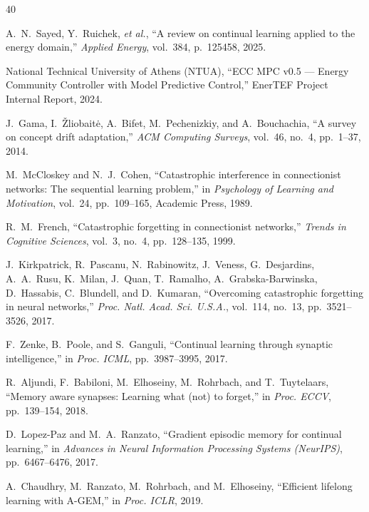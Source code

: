 \documentclass[journal]{IEEEtran}
\begin{document}
\begin{thebibliography}{40}

A.~N.~Sayed, Y.~Ruichek, \emph{et al.}, ``A review on continual
learning applied to the energy domain,'' \emph{Applied Energy},
vol.~384, p.~125458, 2025.

National Technical University of Athens (NTUA), ``ECC MPC v0.5 ---
Energy Community Controller with Model Predictive Control,'' EnerTEF
Project Internal Report, 2024.

J.~Gama, I.~\v{Z}liobait\.e, A.~Bifet, M.~Pechenizkiy, and
A.~Bouchachia, ``A survey on concept drift adaptation,''
\emph{ACM Computing Surveys}, vol.~46, no.~4, pp.~1--37, 2014.

M.~McCloskey and N.~J.~Cohen, ``Catastrophic interference in
connectionist networks: The sequential learning problem,'' in
\emph{Psychology of Learning and Motivation}, vol.~24, pp.~109--165,
Academic Press, 1989.

R.~M.~French, ``Catastrophic forgetting in connectionist networks,''
\emph{Trends in Cognitive Sciences}, vol.~3, no.~4, pp.~128--135, 1999.

J.~Kirkpatrick, R.~Pascanu, N.~Rabinowitz, J.~Veness, G.~Desjardins,
A.~A.~Rusu, K.~Milan, J.~Quan, T.~Ramalho, A.~Grabska-Barwinska,
D.~Hassabis, C.~Blundell, and D.~Kumaran, ``Overcoming catastrophic
forgetting in neural networks,'' \emph{Proc. Natl. Acad. Sci. U.S.A.},
vol.~114, no.~13, pp.~3521--3526, 2017.

F.~Zenke, B.~Poole, and S.~Ganguli, ``Continual learning through
synaptic intelligence,'' in \emph{Proc. ICML}, pp.~3987--3995, 2017.

R.~Aljundi, F.~Babiloni, M.~Elhoseiny, M.~Rohrbach, and T.~Tuytelaars,
``Memory aware synapses: Learning what (not) to forget,'' in
\emph{Proc. ECCV}, pp.~139--154, 2018.

D.~Lopez-Paz and M.~A.~Ranzato, ``Gradient episodic memory for
continual learning,'' in \emph{Advances in Neural Information
Processing Systems (NeurIPS)}, pp.~6467--6476, 2017.

A.~Chaudhry, M.~Ranzato, M.~Rohrbach, and M.~Elhoseiny, ``Efficient
lifelong learning with A-GEM,'' in \emph{Proc. ICLR}, 2019.


\end{thebibliography}
\end{document}
